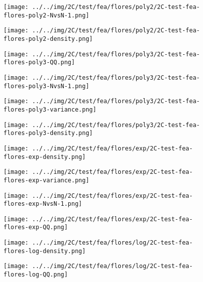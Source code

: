 \begin{figure}[H]
\centering	\texttt{[image: ../../img/2C/test/fea/flores/poly2/2C-test-fea-flores-poly2-NvsN-1.png]}
\end{figure}
\begin{figure}[H]
\centering	\texttt{[image: ../../img/2C/test/fea/flores/poly2/2C-test-fea-flores-poly2-density.png]}
\end{figure}
\begin{figure}[H]
\centering	\texttt{[image: ../../img/2C/test/fea/flores/poly3/2C-test-fea-flores-poly3-QQ.png]}
\end{figure}
\begin{figure}[H]
\centering	\texttt{[image: ../../img/2C/test/fea/flores/poly3/2C-test-fea-flores-poly3-NvsN-1.png]}
\end{figure}
\begin{figure}[H]
\centering	\texttt{[image: ../../img/2C/test/fea/flores/poly3/2C-test-fea-flores-poly3-variance.png]}
\end{figure}
\begin{figure}[H]
\centering	\texttt{[image: ../../img/2C/test/fea/flores/poly3/2C-test-fea-flores-poly3-density.png]}
\end{figure}
\begin{figure}[H]
\centering	\texttt{[image: ../../img/2C/test/fea/flores/exp/2C-test-fea-flores-exp-density.png]}
\end{figure}
\begin{figure}[H]
\centering	\texttt{[image: ../../img/2C/test/fea/flores/exp/2C-test-fea-flores-exp-variance.png]}
\end{figure}
\begin{figure}[H]
\centering	\texttt{[image: ../../img/2C/test/fea/flores/exp/2C-test-fea-flores-exp-NvsN-1.png]}
\end{figure}
\begin{figure}[H]
\centering	\texttt{[image: ../../img/2C/test/fea/flores/exp/2C-test-fea-flores-exp-QQ.png]}
\end{figure}
\begin{figure}[H]
\centering	\texttt{[image: ../../img/2C/test/fea/flores/log/2C-test-fea-flores-log-density.png]}
\end{figure}
\begin{figure}[H]
\centering	\texttt{[image: ../../img/2C/test/fea/flores/log/2C-test-fea-flores-log-QQ.png]}
\end{figure}

